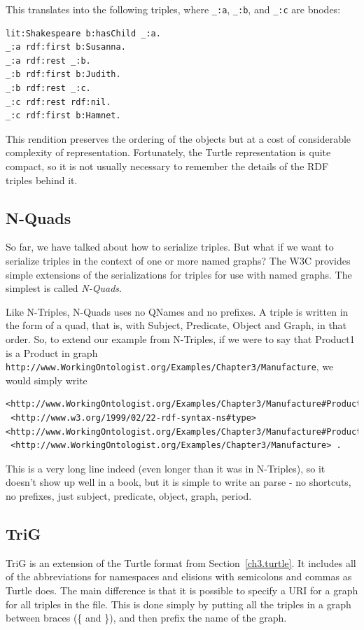 This translates into the following triples, where \texttt{\_:a}, \texttt{\_:b}, and \texttt{\_:c}
are bnodes:

\begin{lstlisting}
lit:Shakespeare b:hasChild _:a.
_:a rdf:first b:Susanna.
_:a rdf:rest _:b.
_:b rdf:first b:Judith.
_:b rdf:rest _:c.
_:c rdf:rest rdf:nil.
_:c rdf:first b:Hamnet.
\end{lstlisting}

This rendition preserves the ordering of the objects but at a cost of
considerable complexity of representation. Fortunately, the Turtle
representation is quite compact, so it is not usually necessary to
remember the details of the RDF triples behind it.

\subsection{N-Quads}

So far, we have talked about how to serialize triples.  But what if we want to 
serialize triples in the context of one or more named graphs?   The W3C provides simple
extensions of the serializations for triples for use with named graphs.  The simplest is
called \emph{N-Quads}. 

Like N-Triples, N-Quads uses no QNames and no prefixes.  A triple is written in the form of a 
quad, that is, with Subject, Predicate, Object and Graph, in that order.  So, to extend our example from 
N-Triples, if we were to say that Product1 is a Product in graph \texttt{http://www.WorkingOntologist.org/Examples/Chapter3/Manufacture}, we would simply write

\begin{lstlisting}
<http://www.WorkingOntologist.org/Examples/Chapter3/Manufacture#Product1>
 <http://www.w3.org/1999/02/22-rdf-syntax-ns#type> <http://www.WorkingOntologist.org/Examples/Chapter3/Manufacture#Product> 
 <http://www.WorkingOntologist.org/Examples/Chapter3/Manufacture> .
\end{lstlisting}

This is a very long line indeed (even longer than it was in N-Triples), so it doesn't show up well
in a book, but it is simple to write an parse - no shortcuts, no prefixes, just subject, predicate, object, graph, period. 

\subsection{TriG}
TriG is an extension of the Turtle format from Section~\ref{ch3.turtle}.  It includes all of the
abbreviations for namespaces and elisions with semicolons and commas as Turtle does.  The main difference is 
that it is possible to specify a URI for a graph for all triples in the file.  This is done simply by 
putting all the triples in a graph between braces (\{ and \}), and then prefix the name of the graph. 

